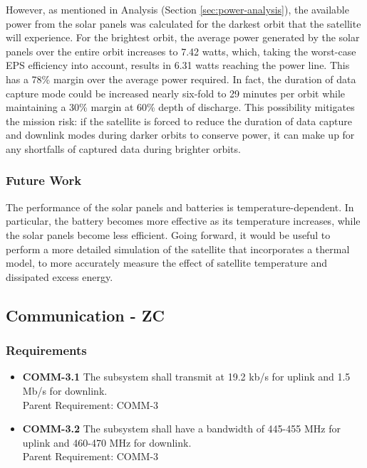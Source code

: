\documentclass[12pt]{article}
\begin{document}
However, as mentioned in Analysis (Section \ref{sec:power-analysis}), the available power from the solar panels was calculated for the darkest orbit that the satellite will experience.  For the brightest orbit, the average power generated by the solar panels over the entire orbit increases to 7.42 watts, which, taking the worst-case EPS efficiency into account, results in 6.31 watts reaching the power line.  This has a 78\% margin over the average power required.  In fact, the duration of data capture mode could be increased nearly six-fold to 29 minutes per orbit while maintaining a 30\% margin at 60\% depth of discharge.  This possibility mitigates the mission risk: if the satellite is forced to reduce the duration of data capture and downlink modes during darker orbits to conserve power, it can make up for any shortfalls of captured data during brighter orbits.

			\subsubsection{Future Work}
The performance of the solar panels and batteries is temperature-dependent.  In particular, the battery becomes more effective as its temperature increases, while the solar panels become less efficient.  Going forward, it would be useful to perform a more detailed simulation of the satellite that incorporates a thermal model, to more accurately measure the effect of satellite temperature and dissipated excess energy.

\newpage
\FloatBarrier
		\subsection{Communication - ZC}

			\subsubsection{Requirements}
			
\begin{itemize}
\item \textbf{COMM-3.1} The subsystem shall transmit at 19.2 kb/s for uplink and 1.5 Mb/s for downlink. \\
Parent Requirement: COMM-3
\item \textbf{COMM-3.2} The subsystem shall have a bandwidth of 445-455 MHz for uplink and 460-470 MHz for downlink. \\
Parent Requirement: COMM-3
\end{itemize}
\end{document}

